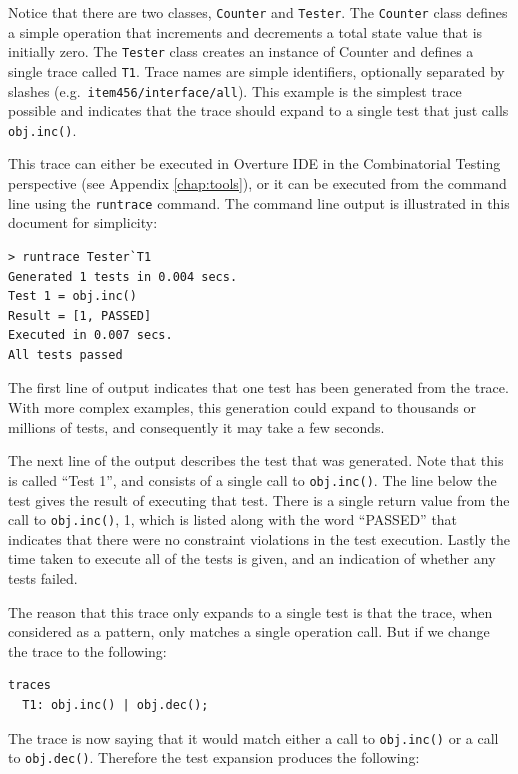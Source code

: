 \documentclass{overturerepchap}
\begin{document}
\noindent Notice that there are two classes, \texttt{Counter} and \texttt{Tester}. The \texttt{Counter} class defines a
simple operation that increments and decrements a total state value that is
initially zero. The \texttt{Tester} class creates an instance of Counter and defines a
single trace called \texttt{T1}. Trace names are simple identifiers, optionally separated
by slashes (e.g.\ \texttt{item456/interface/all}). This example is the simplest
trace possible and indicates that the trace should expand to a single test that
just calls \texttt{obj.inc()}.

This trace can either be executed in Overture IDE in the Combinatorial Testing
perspective (see Appendix \ref{chap:tools}), or it can be executed from
the command line using the \texttt{runtrace} command. The command line output is
illustrated in this document for simplicity:

\lstset{style=tool,language=}
\begin{lstlisting}[escapechar=@]
> runtrace Tester`T1
Generated 1 tests in 0.004 secs. 
Test 1 = obj.inc()
Result = [1, PASSED]
Executed in 0.007 secs. 
All tests passed
\end{lstlisting}
\lstset{style=mystyle}
\lstset{language=VDM++}

\noindent The first line of output indicates that one test has been generated from the
trace. With more complex examples, this generation could expand to thousands or
millions of tests, and consequently it may take a few seconds.

The next line of the output describes the test that was generated. Note that
this is called ``Test 1'', and consists of a single call to \texttt{obj.inc()}.
The line below the test gives the result of executing that test. There is a
single return value from the call to \texttt{obj.inc()}, 1, which is listed
along with the word ``PASSED'' that indicates that there were no constraint violations
in the test execution.
Lastly the time taken to execute all of the tests is given, and an indication of
whether any tests failed.

The reason that this trace only expands to a single test is that the trace, when
considered as a pattern, only matches a single operation call. But if we change
the trace to the following:

\small
\begin{lstlisting}
traces
  T1: obj.inc() | obj.dec();
\end{lstlisting}
\normalsize

\noindent The trace is now saying that it would match either a call to \texttt{obj.inc()}
or a call to \texttt{obj.dec()}. Therefore the test expansion produces the
following:
\end{document}

